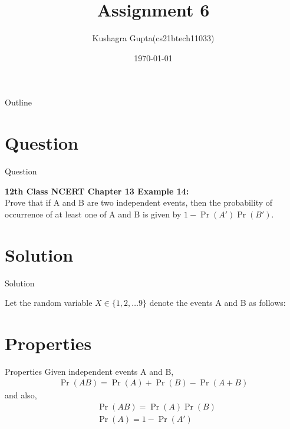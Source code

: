 \documentclass{beamer}
\title{Assignment 6 }
\author{Kushagra Gupta(cs21btech11033)}
\date{\today}
\providecommand{\pr}[1]{\ensuremath{\Pr\left(#1\right)}}
\begin{document}
\begin{frame}
    \titlepage
\end{frame}

\logo{}


\begin{frame}{Outline}
    \tableofcontents
\end{frame}


\section{Question}
\begin{frame}{Question}

\textbf{12th Class NCERT Chapter 13 Example 14:}\\
Prove that if A and B are two independent events, then the probability of occurrence of at least one of A and B is given by $1-\pr{A'}\pr{B'}$.

\end{frame}


\section{Solution}
\begin{frame}{Solution}

\begin{block}{}
Let the random variable $X \in \{1,2,\ldots 9\}$ denote the events A and B as follows:
\begin{table}[ht!]

\caption{}
\label{table:table1}
\end{table}

\end{block}
\end{frame}
\section{Properties}
\begin{frame}{Properties}
Given independent events A and B,
\begin{align}
    \pr{AB} = \pr{A} + \pr{B} - \pr{A+B}
    \label{eq:1}
\end{align}
and also,
\begin{align}
    &\pr{AB} = \pr{A}\pr{B}
    \label{eq:2}\\
    &\pr{A} = 1 - \pr{A'}
    \label{eq:3}
\end{align}
\end{frame}
\end{document}
